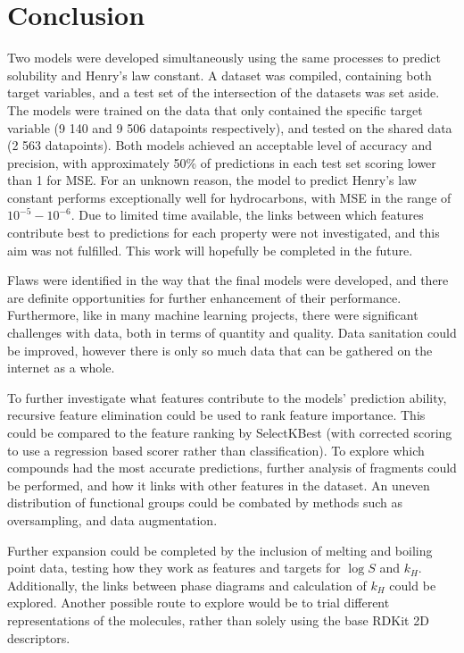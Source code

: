 \documentclass[11pt, titlepage]{article}
\begin{document}
\section{Conclusion}
\label{sec:Conclusion}
Two models were developed simultaneously using the same processes to predict solubility and Henry's law constant. A dataset was compiled, containing both target variables, and a test set of the intersection of the datasets was set aside. The models were trained on the data that only contained the specific target variable (9 140 and 9 506 datapoints respectively), and tested on the shared data (2 563 datapoints). Both models achieved an acceptable level of accuracy and precision, with approximately 50\% of predictions in each test set scoring lower than 1 for MSE. For an unknown reason, the model to predict Henry's law constant performs exceptionally well for hydrocarbons, with MSE in the range of $10^{-5} - 10^{-6}$. Due to limited time available, the links between which features contribute best to predictions for each property were not investigated, and this aim was not fulfilled. This work will hopefully be completed in the future.

Flaws were identified in the way that the final models were developed, and there are definite opportunities for further enhancement of their performance. Furthermore, like in many machine learning projects, there were significant challenges with data, both in terms of quantity and quality. Data sanitation could be improved, however there is only so much data that can be gathered on the internet as a whole.

To further investigate what features contribute to the models' prediction ability, recursive feature elimination could be used to rank feature importance. This could be compared to the feature ranking by SelectKBest (with corrected scoring to use a regression based scorer rather than classification). To explore which compounds had the most accurate predictions, further analysis of fragments could be performed, and how it links with other features in the dataset. An uneven distribution of functional groups could be combated by methods such as oversampling, and data augmentation.

Further expansion could be completed by the inclusion of melting and boiling point data, testing how they work as features and targets for $\log S$ and $k_H$. Additionally, the links between phase diagrams and calculation of $k_H$ could be explored. Another possible route to explore would be to trial different representations of the molecules, rather than solely using the base RDKit 2D descriptors.
\end{document}

